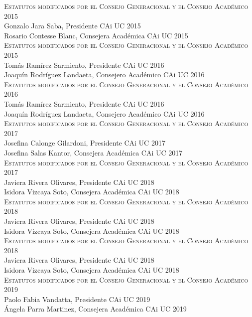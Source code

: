 \documentclass[letterpaper,11pt]{article}
\theoremstyle{definition}%
\begin{document}
\begin{sloppypar}
	\textsc{Estatutos modificados por el Consejo Generacional y el Consejo Académico 2015}\\
	Gonzalo Jara Saba, Presidente CAi UC 2015\\
	Rosario Contesse Blanc, Consejera Académica CAi UC 2015\\

	\textsc{Estatutos modificados por el Consejo Generacional y el Consejo Académico 2015}\\
	Tomás Ramírez Sarmiento, Presidente CAi UC 2016\\
	Joaquín Rodríguez Landaeta, Consejero Académico CAi UC 2016\\

	\textsc{Estatutos modificados por el Consejo Generacional y el Consejo Académico 2016}\\
	Tomás Ramírez Sarmiento, Presidente CAi UC 2016\\
	Joaquín Rodríguez Landaeta, Consejero Académico CAi UC 2016\\

	\textsc{Estatutos modificados por el Consejo Generacional y el Consejo Académico 2017}\\
	Josefina Calonge Gilardoni, Presidente CAi UC 2017\\
	Josefina Salas Kantor, Consejera Académica CAi UC 2017\\

	\textsc{Estatutos modificados por el Consejo Generacional y el Consejo Académico 2017}\\
	Javiera Rivera Olivares, Presidente CAi UC 2018\\
	Isidora Vizcaya Soto, Consejera Académica CAi UC 2018\\

	\textsc{Estatutos modificados por el Consejo Generacional y el Consejo Académico 2018}\\
	Javiera Rivera Olivares, Presidente CAi UC 2018\\
	Isidora Vizcaya Soto, Consejera Académica CAi UC 2018\\

	\textsc{Estatutos modificados por el Consejo Generacional y el Consejo Académico 2018}\\
	Javiera Rivera Olivares, Presidente CAi UC 2018\\
	Isidora Vizcaya Soto, Consejera Académica CAi UC 2018\\

	\textsc{Estatutos modificados por el Consejo Generacional y el Consejo Académico 2019}\\
	Paolo Fabia Vandatta, Presidente CAi UC 2019\\
	Ángela Parra Martinez, Consejera Académica CAi UC 2019\\

\end{sloppypar}
\end{document}
